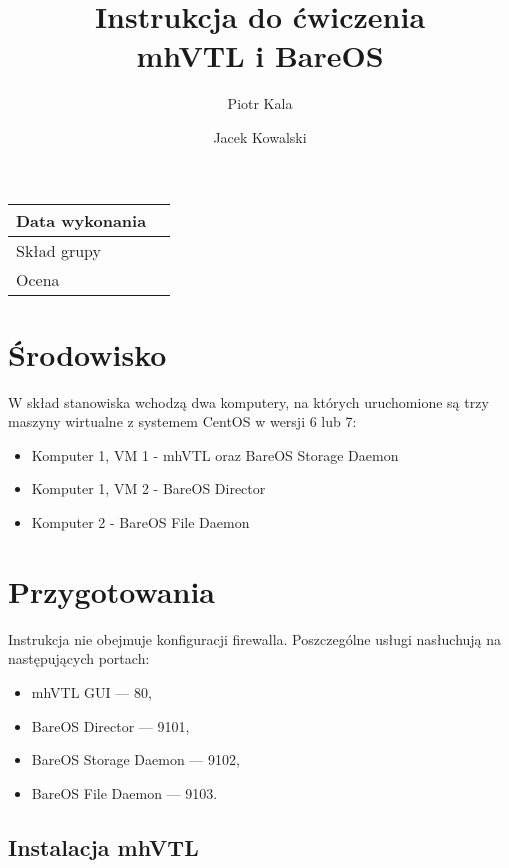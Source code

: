 \documentclass[polish]{article}
\title{\textbf{Instrukcja do ćwiczenia}\\ mhVTL i BareOS}
\author{Piotr Kala \and Jacek Kowalski}
\begin{document}
\maketitle

\begin{tabular}{|l|p{}|}
\hline
Data wykonania & \\
\hline
Skład grupy & \\
\hline
Ocena & \\
\hline
\end{tabular}

\vspace{0.5cm}

\renewcommand{\labelenumi}{$\Box$\texttt{\theenumi}}
\renewcommand{\labelenumii}{$\Box$\texttt{\theenumii}}


\section{Środowisko}

W skład stanowiska wchodzą dwa komputery, na których uruchomione są
trzy maszyny wirtualne z systemem CentOS w wersji 6 lub 7:

\begin{itemize}
\item Komputer 1, VM 1 - mhVTL oraz BareOS Storage Daemon
\item Komputer 1, VM 2 - BareOS Director
\item Komputer 2 - BareOS File Daemon
\end{itemize}


\section{Przygotowania}

Instrukcja nie obejmuje konfiguracji firewalla.
Poszczególne usługi nasłuchują na następujących portach:

\begin{itemize}
\item mhVTL GUI --- 80,
\item BareOS Director --- 9101,
\item BareOS Storage Daemon --- 9102,
\item BareOS File Daemon --- 9103.
\end{itemize}


\subsection*{Instalacja mhVTL}
\end{document}
